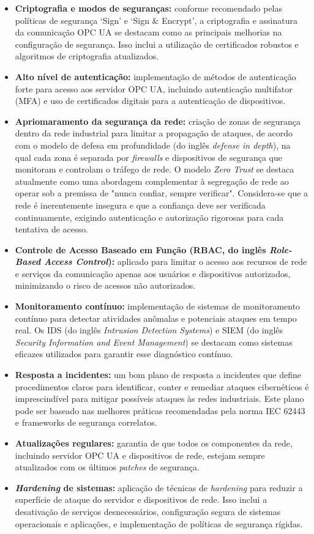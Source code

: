     \begin{itemize}
        \item \textbf{Criptografia e modos de seguranças:} conforme recomendado pelas políticas de segurança `Sign' e `Sign \& Encrypt', a criptografia e assinatura da comunicação OPC UA se destacam como as principais melhorias na configuração de segurança. Isso inclui a utilização de certificados robustos e algoritmos de criptografia atualizados.
        \item \textbf{Alto nível de autenticação:} implementação de métodos de autenticação forte para acesso aos servidor OPC UA, incluindo autenticação multifator (MFA) e uso de certificados digitais para a autenticação de dispositivos.
        \item \textbf{Apriomaramento da segurança da rede:} criação de zonas de segurança dentro da rede industrial para limitar a propagação de ataques, de acordo com o modelo de defesa em profundidade (do inglês \textit{defense in depth}), na qual cada zona é separada por \textit{firewalls} e dispositivos de segurança que monitoram e controlam o tráfego de rede. O modelo \textit{Zero Trust} se destaca atualmente como uma abordagem complementar à segregação de rede ao operar sob a premissa de "nunca confiar, sempre verificar". Considera-se que a rede é inerentemente insegura e que a confiança deve ser verificada continuamente, exigindo autenticação e autorização rigorosas para cada tentativa de acesso. 
        \item \textbf{Controle de Acesso Baseado em Função (RBAC, do inglês \textit{Role-Based Access Control}):} aplicado para limitar o acesso aos recursos de rede e serviços da comunicação apenas aos usuários e dispositivos autorizados, minimizando o risco de acessos não autorizados.
        \item \textbf{Monitoramento contínuo:} implementação de sistemas de monitoramento contínuo para detectar atividades anômalas e potenciais ataques em tempo real. Os IDS (do inglês \textit{Intrusion Detection Systems}) e SIEM (do inglês \textit{Security Information and Event Management}) se destacam como sistemas eficazes utilizados para garantir esse diagnóstico contínuo.
        \item \textbf{Resposta a incidentes:} um bom plano de resposta a incidentes que define procedimentos claros para identificar, conter e remediar ataques cibernéticos é imprescindível para mitigar possíveis ataques às redes industriais. Este plano pode ser baseado nas melhores práticas recomendadas pela norma IEC 62443 e frameworks de segurança correlatos.
        \item \textbf{Atualizações regulares:} garantia de que todos os componentes da rede, incluindo servidor OPC UA e dispositivos de rede, estejam sempre atualizados com os últimos \textit{patches} de segurança.
        \item \textbf{\textit{Hardening} de sistemas:} aplicação de técnicas de \textit{hardening} para reduzir a superfície de ataque do servidor e dispositivos de rede. Isso inclui a desativação de serviços desnecessários, configuração segura de sistemas operacionais e aplicações, e implementação de políticas de segurança rígidas.
    \end{itemize}

